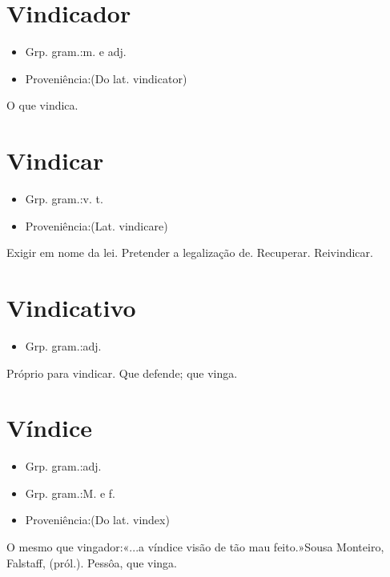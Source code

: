 \documentclass{article}
\begin{document}
\section{Vindicador}
\begin{itemize}
\item {Grp. gram.:m.  e  adj.}
\end{itemize}
\begin{itemize}
\item {Proveniência:(Do lat. \textunderscore vindicator\textunderscore )}
\end{itemize}
O que vindica.
\section{Vindicar}
\begin{itemize}
\item {Grp. gram.:v. t.}
\end{itemize}
\begin{itemize}
\item {Proveniência:(Lat. \textunderscore vindicare\textunderscore )}
\end{itemize}
Exigir em nome da lei.
Pretender a legalização de.
Recuperar.
Reivindicar.
\section{Vindicativo}
\begin{itemize}
\item {Grp. gram.:adj.}
\end{itemize}
Próprio para vindicar.
Que defende; que vinga.
\section{Víndice}
\begin{itemize}
\item {Grp. gram.:adj.}
\end{itemize}
\begin{itemize}
\item {Grp. gram.:M.  e  f.}
\end{itemize}
\begin{itemize}
\item {Proveniência:(Do lat. \textunderscore vindex\textunderscore )}
\end{itemize}
O mesmo que \textunderscore vingador\textunderscore :«\textunderscore ...a víndice visão de tão mau feito.\textunderscore »Sousa Monteiro, \textunderscore Falstaff\textunderscore , (pról.).
Pessôa, que vinga.
\end{document}

